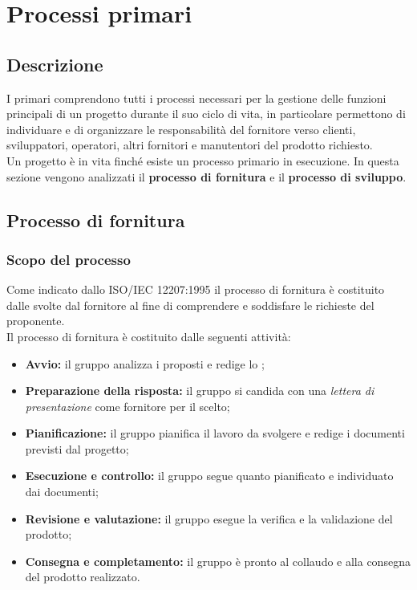 \section{Processi primari}
\label{PP}
\subsection{Descrizione}\label{PP_Descrizione}
I  primari comprendono tutti i processi necessari per la gestione delle funzioni principali di un progetto durante il suo ciclo di vita, in particolare permettono di individuare e di organizzare le responsabilità del fornitore verso clienti, sviluppatori, operatori, altri fornitori e manutentori del prodotto richiesto.\\
Un progetto è in vita finché esiste un processo primario in esecuzione.
In questa sezione vengono analizzati il \textbf{processo di fornitura} e il \textbf{processo di sviluppo}.

\subsection{Processo di fornitura}
\subsubsection{Scopo del processo}\label{PF_Scopo}
Come indicato dallo  ISO/IEC 12207:1995 il processo di fornitura è costituito dalle  svolte dal fornitore al fine di comprendere e soddisfare le richieste del proponente.\\
Il processo di fornitura è costituito dalle seguenti attività:
\begin{itemize}
	\item \textbf{Avvio:} il gruppo analizza i  proposti e redige lo \SdF{};	
	\item \textbf{Preparazione della risposta:} il gruppo si candida con una \textit{lettera di presentazione} come fornitore per il  scelto;
	\item \textbf{Pianificazione:} il gruppo pianifica il lavoro da svolgere e redige i documenti previsti dal progetto;
	\item \textbf{Esecuzione e controllo:} il gruppo segue quanto pianificato e individuato dai documenti;
	\item \textbf{Revisione e valutazione:} il gruppo esegue la verifica e la validazione del prodotto;
	\item \textbf{Consegna e completamento:} il gruppo è pronto al collaudo e alla consegna del prodotto realizzato.
\end{itemize}

